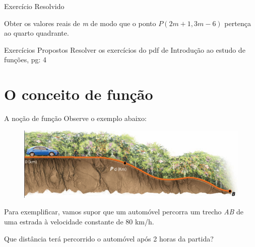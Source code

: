 \documentclass[aspectratio=169,xcolor=dvipsnames]{beamer}
\begin{document}

\begin{frame}{Exercício Resolvido}
  \begin{examples}
    Obter os valores reais de \textit{m} de modo que o ponto $P(2m+1, 3m-6)$ pertença ao quarto quadrante.
  \end{examples}
\end{frame}



\begin{frame}{Exercícios Propostos}
  \centering Resolver os exercícios do pdf de Introdução ao estudo de funções, pg: 4
\end{frame}


\section{O conceito de função}

\begin{frame}{A noção de função}
  Observe o exemplo abaixo:
  \begin{figure}[htb!]
    \centering
    \includegraphics[width=.8\linewidth]{figures/3.png}
  \end{figure}
  Para exemplificar, vamos supor que um automóvel percorra um trecho \textit{AB} de uma estrada à velocidade constante de 
  80 km/h. 

  Que distância terá percorrido o automóvel após 2 horas da partida?
  
\end{frame}

\end{document}
